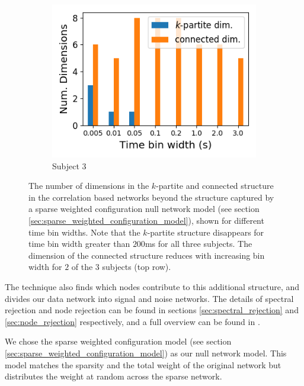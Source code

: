 \begin{figure}[p]
    \begin{subfigure}[h]{0.5\linewidth}
      \centering
      \includegraphics[width=\linewidth]{figures/eight_probe/Robbins_rectified_total_structure_dims.png}
      \caption{Subject 3}
      \label{fig:Robbins_rectified_total_structure_dims}
    \end{subfigure}
    \caption{The number of dimensions in the $k$-partite and connected structure in the correlation based networks beyond the structure captured by a sparse weighted configuration null network model (see section \ref{sec:sparse_weighted_configuration_model}), shown for different time bin widths. Note that the $k$-partite structure disappears for time bin width greater than $200$ms for all three subjects. The dimension of the connected structure reduces with increasing bin width for $2$ of the $3$ subjects (top row).}
    \label{fig:structure_dims}
  \end{figure}

  The technique also finds which nodes contribute to this additional structure, and divides our data network into signal and noise networks. The details of spectral rejection and node rejection can be found in sections \ref{sec:spectral_rejection} and \ref{sec:node_rejection} respectively, and a full overview can be found in  \parencite{humphries}.

  We chose the sparse weighted configuration model (see section \ref{sec:sparse_weighted_configuration_model}) as our null network model. This model matches the sparsity and the total weight of the original network but distributes the weight at random across the sparse network.

